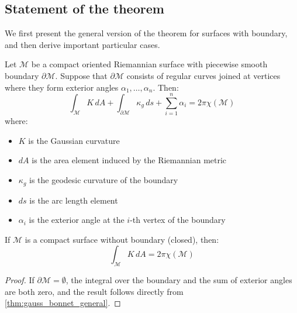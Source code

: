 \subsection{Statement of the theorem}\label{subsec:gauss_bonnet_enunciado}

We first present the general version of the theorem for surfaces with boundary, and then derive important particular cases.

\begin{theorem}\label{thm:gauss_bonnet_general}
Let $\mathcal{M}$ be a compact oriented Riemannian surface with piecewise smooth boundary $\partial \mathcal{M}$. Suppose that $\partial \mathcal{M}$ consists of regular curves joined at vertices where they form exterior angles $\alpha_1, \ldots, \alpha_n$. Then:
\begin{equation}\label{eq:gauss_bonnet_general}
\int_{\mathcal{M}} K \, dA + \int_{\partial \mathcal{M}} \kappa_g \, ds + \sum_{i=1}^n \alpha_i = 2\pi \chi(\mathcal{M})
\end{equation}
where:
\begin{itemize}
    \item $K$ is the Gaussian curvature
    \item $dA$ is the area element induced by the Riemannian metric
    \item $\kappa_g$ is the geodesic curvature of the boundary
    \item $ds$ is the arc length element
    \item $\alpha_i$ is the exterior angle at the $i$-th vertex of the boundary
\end{itemize}
\end{theorem}

\begin{corollary}\label{cor:gauss_bonnet_cerradas}
If $\mathcal{M}$ is a compact surface without boundary (closed), then:
\begin{equation}\label{eq:gauss_bonnet_cerradas}
\int_{\mathcal{M}} K \, dA = 2\pi \chi(\mathcal{M})
\end{equation}
\end{corollary}

\begin{proof}
If $\partial \mathcal{M} = \emptyset$, the integral over the boundary and the sum of exterior angles are both zero, and the result follows directly from \autoref{thm:gauss_bonnet_general}.
\end{proof}

